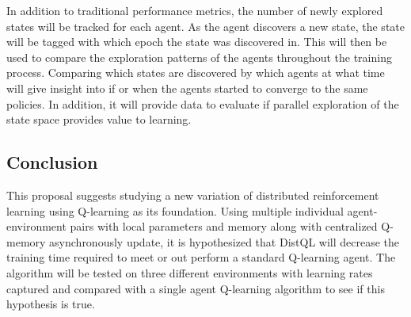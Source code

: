\documentclass[jair,twoside,11pt,theapa]{article}
\begin{document}
In addition to traditional performance metrics, the number of newly explored states will be tracked for each agent. As the agent discovers a new state, the state will be tagged with which epoch
the state was discovered in. This will then be used to compare the exploration patterns of the agents throughout the training process. Comparing which states are discovered by which agents at what time
will give insight into if or when the agents started to converge to the same policies. In addition, it will provide data to evaluate if parallel exploration of the state space provides value to learning. 

\subsection{Conclusion}
This proposal suggests studying a new variation of distributed reinforcement learning using Q-learning as its foundation. Using multiple individual agent-environment pairs with local parameters and memory along with centralized Q-memory asynchronously update, it is hypothesized that DistQL will decrease the training time required to meet or out perform a standard Q-learning agent. The algorithm will be tested on three different environments with learning rates captured and compared with a single agent Q-learning algorithm to see if this hypothesis is true.

\vskip 0.2in


\end{document}
